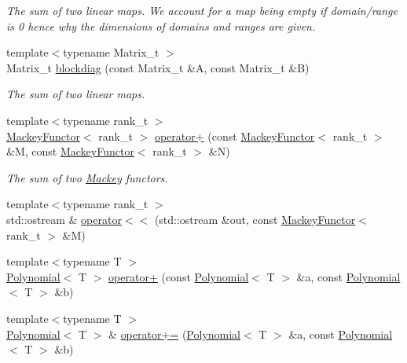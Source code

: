 \begin{DoxyCompactItemize}
\begin{DoxyCompactList}\small\item\em The sum of two linear maps. We account for a map being empty if domain/range is 0 hence why the dimensions of domains and ranges are given. \end{DoxyCompactList}\item 
{\footnotesize template$<$typename Matrix\+\_\+t $>$ }\\Matrix\+\_\+t \hyperlink{namespaceMackey_a64d299f4b6f36e4b4e873b56a44b14b0}{blockdiag} (const Matrix\+\_\+t \&A, const Matrix\+\_\+t \&B)
\begin{DoxyCompactList}\small\item\em The sum of two linear maps. \end{DoxyCompactList}\item 
{\footnotesize template$<$typename rank\+\_\+t $>$ }\\\hyperlink{classMackey_1_1MackeyFunctor}{Mackey\+Functor}$<$ rank\+\_\+t $>$ \hyperlink{namespaceMackey_a738f2b46b7d0c37be203a17083801bbd}{operator+} (const \hyperlink{classMackey_1_1MackeyFunctor}{Mackey\+Functor}$<$ rank\+\_\+t $>$ \&M, const \hyperlink{classMackey_1_1MackeyFunctor}{Mackey\+Functor}$<$ rank\+\_\+t $>$ \&N)
\begin{DoxyCompactList}\small\item\em The sum of two \hyperlink{namespaceMackey}{Mackey} functors. \end{DoxyCompactList}\item 
{\footnotesize template$<$typename rank\+\_\+t $>$ }\\std\+::ostream \& \hyperlink{namespaceMackey_aaf9e6d978fdb55a757223964390b2fc0}{operator$<$$<$} (std\+::ostream \&out, const \hyperlink{classMackey_1_1MackeyFunctor}{Mackey\+Functor}$<$ rank\+\_\+t $>$ \&M)
\item 
{\footnotesize template$<$typename T $>$ }\\\hyperlink{classMackey_1_1Polynomial}{Polynomial}$<$ T $>$ \hyperlink{namespaceMackey_a61f8cf9c3cf22acfedda5f427423f6c4}{operator+} (const \hyperlink{classMackey_1_1Polynomial}{Polynomial}$<$ T $>$ \&a, const \hyperlink{classMackey_1_1Polynomial}{Polynomial}$<$ T $>$ \&b)
\item 
{\footnotesize template$<$typename T $>$ }\\\hyperlink{classMackey_1_1Polynomial}{Polynomial}$<$ T $>$ \& \hyperlink{namespaceMackey_a29199dd05885558a19e305b49ab7b180}{operator+=} (\hyperlink{classMackey_1_1Polynomial}{Polynomial}$<$ T $>$ \&a, const \hyperlink{classMackey_1_1Polynomial}{Polynomial}$<$ T $>$ \&b)

\end{DoxyCompactItemize}
